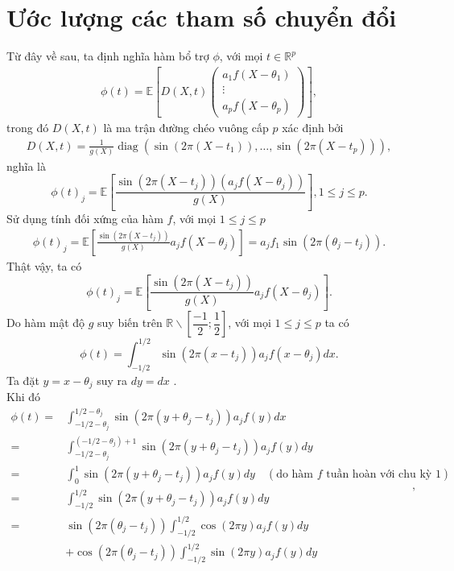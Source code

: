 \section{Ước lượng các tham số chuyển đổi}
Từ đây về sau, ta định nghĩa hàm bổ trợ $\phi$, với mọi $t \in \mathbb{R}^{p}$
\begin{align}
    \phi(t)=\mathbb{E}\left[D(X, t)\left(\begin{array}{c}
a_{1} f\left(X-\theta_{1}\right) \\
\vdots \\
a_{p} f\left(X-\theta_{p}\right)
\end{array}\right)\right],
\label{4.1}
\end{align}
\noindent trong đó $D(X, t)$ là ma trận đường chéo vuông cấp $p$ xác định bởi
\begin{align}
    D(X, t)=\frac{1}{g(X)} \operatorname{diag}\left(\sin \left(2 \pi\left(X-t_{1}\right)\right), \ldots, \sin \left(2 \pi\left(X-t_{p}\right)\right)\right),
    \label{4.2}
\end{align}
nghĩa là 
$$
\phi\left(t\right)_j = \mathbb{E}\left[\frac{\sin \left(2 \pi\left(X-t_j\right)\right)\left(a_j f\left(X-\theta_j\right)\right)}{g\left(X\right)}\right], 1\leq j \leq p.
$$
Sử dụng tính đối xứng của hàm $f$, với mọi $1 \leq j \leq p$
\begin{align}
    \phi(t)_j = \mathbb{E}\left[\frac{\sin \left(2 \pi\left(X-t_{j}\right)\right)}{g(X)} a_{j} f\left(X-\theta_{j}\right)\right]=a_{j} f_{1} \sin \left(2 \pi\left(\theta_{j}-t_{j}\right)\right).
    \label{4.3}
\end{align}
Thật vậy, ta có
$$
\phi(t)_j = \mathbb{E}\left[\frac{\sin \left(2 \pi\left(X-t_{j}\right)\right)}{g(X)} a_{j} f\left(X-\theta_{j}\right)\right].
$$
Do hàm mật độ $g$ suy biến trên $\mathbb{R}\backslash \left[ \dfrac{-1}{2}; \dfrac{1}{2}\right]$, với mọi $1 \leq j \leq p$ ta có
$$
\phi(t)=\int_{-1 / 2}^{1 / 2} \sin \left(2 \pi\left(x-t_{j}\right)\right)a_{j} f\left(x-\theta_{j}\right) d x.
$$
Ta đặt $y=x-\theta_j$ suy ra $dy=dx$ .\\
Khi đó
$$
\begin{aligned}
\phi(t) 
= & \int_{-1 / 2 - \theta_j}^{1 / 2 - \theta_j} \sin \left(2 \pi\left(y + \theta_j -t_{j}\right)\right)a_{j} f\left(y\right) d x \\
= & \int_{-1 / 2 - \theta_j}^{\left(-1 / 2 - \theta_j \right) + 1} \sin (2 \pi(y+\theta_j-t_{j}))a_{j} f(y) d y \\
= & \int_{0}^{1} \sin (2 \pi(y+\theta_j-t_{j}))a_{j} f(y) d y \quad \left(\text{do hàm $f$ tuần hoàn với chu kỳ $1$}\right)\\
= & \int_{-1 / 2}^{1 / 2} \sin (2 \pi(y+\theta_j-t_{j})) a_{j}f(y) d y \\
= & \sin (2 \pi(\theta_j-t_{j})) \int_{-1 / 2}^{1 / 2} \cos (2 \pi y) a_{j}f(y) d y \\
& +\cos (2 \pi(\theta_j-t_{j})) \int_{-1 / 2}^{1 / 2} \sin (2 \pi y) a_{j}f(y) d y
\end{aligned},
$$
